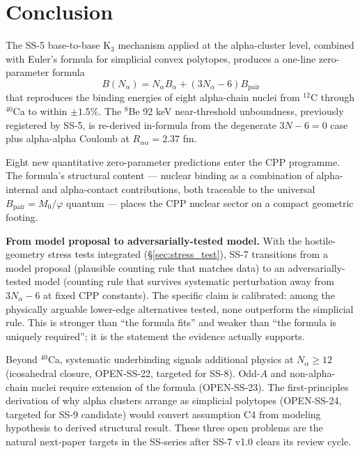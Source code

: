 \documentclass[11pt,letterpaper]{article}
\newcommand{\phig}{\varphi}
\newcommand{\Mzero}{M_0}
\newcommand{\Bpair}{B_{\mathrm{pair}}}
\newcommand{\Balpha}{B_{\alpha}}
\newcommand{\Nalpha}{N_{\alpha}}
\newcommand{\Raa}{R_{\alpha\alpha}}
\begin{document}
\section{Conclusion}
\label{sec:conclusion}

The SS-5 base-to-base K$_3$ mechanism applied at the alpha-cluster level, combined with Euler's formula for simplicial convex polytopes, produces a one-line zero-parameter formula
\[
B(\Nalpha) = \Nalpha \Balpha + (3\Nalpha - 6) \Bpair
\]
that reproduces the binding energies of eight alpha-chain nuclei from ${}^{12}$C through ${}^{40}$Ca to within $\pm 1.5\%$. The ${}^8$Be 92 keV near-threshold unboundness, previously registered by SS-5, is re-derived in-formula from the degenerate $3N - 6 = 0$ case plus alpha-alpha Coulomb at $\Raa = 2.37$ fm.

Eight new quantitative zero-parameter predictions enter the CPP programme. The formula's structural content --- nuclear binding as a combination of alpha-internal and alpha-contact contributions, both traceable to the universal $\Bpair = \Mzero/\phig$ quantum --- places the CPP nuclear sector on a compact geometric footing.

\textbf{From model proposal to adversarially-tested model.} With the hostile-geometry stress tests integrated (\S\ref{sec:stress_test}), SS-7 transitions from a model proposal (plausible counting rule that matches data) to an adversarially-tested model (counting rule that survives systematic perturbation away from $3\Nalpha - 6$ at fixed CPP constants). The specific claim is calibrated: among the physically arguable lower-edge alternatives tested, none outperform the simplicial rule. This is stronger than ``the formula fits'' and weaker than ``the formula is uniquely required''; it is the statement the evidence actually supports.

Beyond ${}^{40}$Ca, systematic underbinding signals additional physics at $\Nalpha \geq 12$ (icosahedral closure, OPEN-SS-22, targeted for SS-8). Odd-$A$ and non-alpha-chain nuclei require extension of the formula (OPEN-SS-23). The first-principles derivation of why alpha clusters arrange as simplicial polytopes (OPEN-SS-24, targeted for SS-9 candidate) would convert assumption C4 from modeling hypothesis to derived structural result. These three open problems are the natural next-paper targets in the SS-series after SS-7 v1.0 clears its review cycle.
\end{document}
